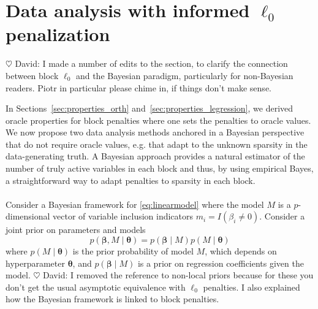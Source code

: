 \documentclass[aos]{imsart}
\theoremstyle{plain}
\newcommand{\david}[1]{{\small{\color{blue} \sf $\heartsuit$ David: #1}}}
\newcommand{\bs}{\boldsymbol}
\begin{document}
\section{Data analysis with informed $\ell_0$ penalization}\label{sec:informed_l0}

\david{I made a number of edits to the section, to clarify the connection between block $\ell_0$ and the Bayesian paradigm, particularly for non-Bayesian readers. Piotr in particular please chime in, if things don't make sense.}

In Sections~\ref{sec:properties_orth} and~\ref{sec:properties_legression}, we derived oracle properties for block penalties where one sets the penalties to oracle values.
We now %
propose two data analysis methods anchored in a Bayesian perspective %
that do not require oracle values, e.g. that adapt to the unknown sparsity in the data-generating truth.
A Bayesian approach provides a natural estimator of the number of truly active variables in each block and thus, by using empirical Bayes, a straightforward way to adapt penalties to sparsity in each block. %
\\
\\
Consider a Bayesian framework for \eqref{eq:linearmodel} where %
the model $M$ is a $p$-dimensional vector of variable inclusion indicators $m_i=I(\beta_i \neq 0)$. Consider a joint prior on parameters and models 
\begin{equation}\label{eq:bayesianframework}
    p(\boldsymbol{\beta},M \mid \boldsymbol{\theta})=p( \boldsymbol{\beta} \mid  M) p(M \mid \boldsymbol{\theta})
\end{equation}
where $p(M \mid \boldsymbol{\theta})$ is the prior probability of model $M$, which depends on hyperparameter $\bs \theta$,
and $p( \boldsymbol{\beta} \mid  M)$ is a prior on regression coefficients given the model. %
\david{I removed the reference to non-local priors because for these you don't get the usual asymptotic equivalence with $\ell_0$ penalties. I also explained how the Bayesian framework is linked to block penalties. 
}
\end{document}
